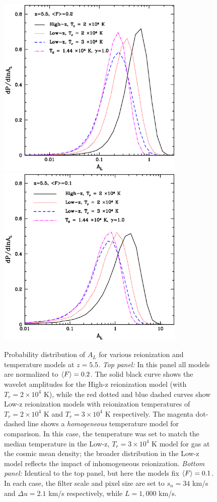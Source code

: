 \begin{figure}
\bc
\includegraphics[width=9cm]{f14a.eps}
\includegraphics[width=9cm]{f14b.eps}
\caption{Probability distribution of $A_L$ for various reionization and temperature models at $z=5.5$. {\it Top panel:} In this panel all models are normalized
to $\langle F \rangle=0.2$. The solid black curve shows the wavelet amplitudes for the High-z reionization model (with $T_r = 2 \times 10^4$ K), while the red dotted and blue dashed curves show
Low-z reionization models with reionization temperatures of $T_r = 2 \times 10^4$ K and $T_r = 3 \times 10^4$ K respectively. The magenta dot-dashed line
shows a {\em homogeneous} temperature model for comparison. In this case, the temperature was set to match the median temperature in the
 Low-z, $T_r = 3 \times 10^4$ K model for
gas at the cosmic mean density; the broader distribution in the Low-z model reflects the impact of inhomogeneous reionization. 
{\it Bottom panel:} Identical to the top panel, but here the models fix $\langle F \rangle=0.1$. In each case, the filter scale and pixel size are set to $s_n=34$ km/s and $\Delta u=2.1$ km/s respectively,
while $L=1,000$ km/s.}
\label{fig:pdf_al_inhomog}
\ec
\end{figure}


